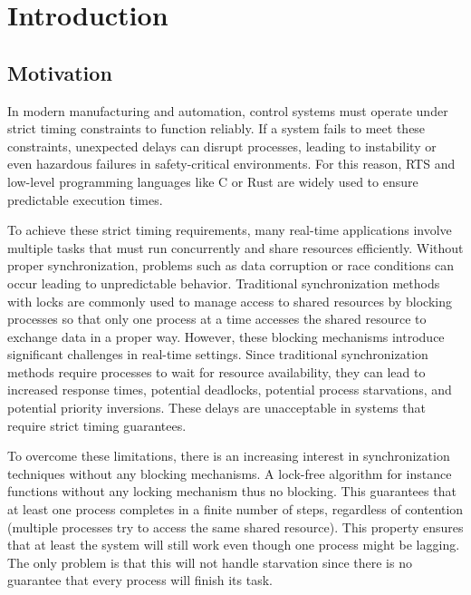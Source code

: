 \chapter{Introduction}\label{ch:introduction}

\section{Motivation}\label{sec:motivation}

In modern manufacturing and automation, control systems must operate under strict timing constraints to function reliably. If a system fails to meet these constraints, unexpected delays can disrupt processes, leading to instability or even hazardous failures in safety-critical environments. For this reason, \ac{RTS} and low-level programming languages like C or Rust are widely used to ensure predictable execution times.

To achieve these strict timing requirements, many real-time applications involve multiple tasks that must run concurrently and share resources efficiently. Without proper synchronization, problems such as data corruption or race conditions can occur leading to unpredictable behavior. Traditional synchronization methods with locks are commonly used to manage access to shared resources by blocking processes so that only one process at a time accesses the shared resource to exchange data in a proper way. However, these blocking mechanisms introduce significant challenges in real-time settings. Since traditional synchronization methods require processes to wait for resource availability, they can lead to increased response times, potential deadlocks, potential process starvations, and potential priority inversions. These delays are unacceptable in systems that require strict timing guarantees. \cite{herlihy1991wait, brandenburg2019multiprocessorrealtimelockingprotocols, kode2024analysisSynchronization}

To overcome these limitations, there is an increasing interest in synchronization techniques without any blocking mechanisms. A lock-free algorithm for instance functions without any locking mechanism thus no blocking. This guarantees that at least one process completes in a finite number of steps, regardless of contention (multiple processes try to access the same shared resource). This property ensures that at least the system will still work even though one process might be lagging. The only problem is that this will not handle starvation since there is no guarantee that every process will finish its task. \cite{kogan2012methodology}

